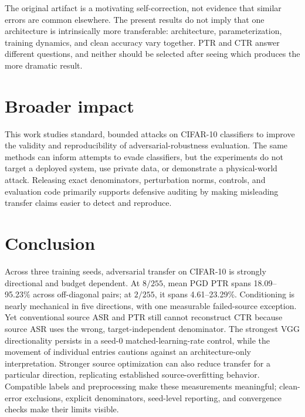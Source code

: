 \documentclass[10pt]{article}
\begin{document}
The original artifact is a motivating self-correction, not evidence that similar errors are common elsewhere. The present results do not imply that one architecture is intrinsically more transferable: architecture, parameterization, training dynamics, and clean accuracy vary together. PTR and CTR answer different questions, and neither should be selected after seeing which produces the more dramatic result.

\section{Broader impact}
This work studies standard, bounded attacks on CIFAR-10 classifiers to improve the validity and reproducibility of adversarial-robustness evaluation. The same methods can inform attempts to evade classifiers, but the experiments do not target a deployed system, use private data, or demonstrate a physical-world attack. Releasing exact denominators, perturbation norms, controls, and evaluation code primarily supports defensive auditing by making misleading transfer claims easier to detect and reproduce.

\section{Conclusion}
Across three training seeds, adversarial transfer on CIFAR-10 is strongly directional and budget dependent. At $8/255$, mean PGD PTR spans 18.09--95.23\% across off-diagonal pairs; at $2/255$, it spans 4.61--23.29\%. Conditioning is nearly mechanical in five directions, with one measurable failed-source exception. Yet conventional source ASR and PTR still cannot reconstruct CTR because source ASR uses the wrong, target-independent denominator. The strongest VGG directionality persists in a seed-0 matched-learning-rate control, while the movement of individual entries cautions against an architecture-only interpretation. Stronger source optimization can also reduce transfer for a particular direction, replicating established source-overfitting behavior. Compatible labels and preprocessing make these measurements meaningful; clean-error exclusions, explicit denominators, seed-level reporting, and convergence checks make their limits visible.



\end{document}

